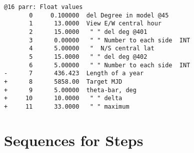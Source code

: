 \documentclass{article}
\begin{document}
\begin{verbatim}
@16 parr: Float values 
       0     0.100000  del Degree in model @45
       1      13.0000  View E/W central hour
       2      15.0000   " " del deg @401
       3      0.00000   " " Number to each side  INT
       4      5.00000   "  N/S central lat
       5      15.0000   " " del deg @402
       6      5.00000   " " Number to each side  INT
-      7      436.423  Length of a year
+      8      5858.00  Target MJD
+      9      5.00000  theta-bar, deg
+     10      10.0000   " " delta
+     11      33.0000   " " maximum
\end{verbatim}  

\section{Sequences for Steps}
\vspace{-3.mm} 
\end{document}
